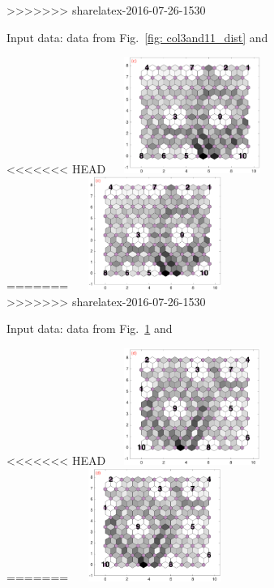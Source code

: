\begin{figure}
\begin{subfigure}[b]{0.25\textwidth}
>>>>>>> sharelatex-2016-07-26-1530
        \caption{Input data: data from Fig.~\ref{fig: col3and11_dist} and \oiii}
        \label{fig: col3and12_dist}
    \end{subfigure}
        \hfill
    \begin{subfigure}[b]{0.25\textwidth}
        \centering
<<<<<<< HEAD
        \includegraphics[width=54mm, height=38mm]{../../images0.01/M31/2D/diff_dimension/combine_2D_data_between_cols3and13.png}
=======
        \includegraphics[width=54mm, height=37mm]{../../images0.01/M31/2D/diff_dimension/combine_2D_data_between_cols3and13.png}
>>>>>>> sharelatex-2016-07-26-1530
        \caption{Input data: data from Fig.~\ref{fig: col3and12_dist} and \sii}
        \label{fig: col3and13_dist}
    \end{subfigure}
        \hfill
    \begin{subfigure}[b]{0.25\textwidth}
        \centering
<<<<<<< HEAD
        \includegraphics[width=54mm, height=38mm]{../../images0.01/M31/2D/diff_dimension/combine_2D_data_between_cols3and14.png}
=======
        \includegraphics[width=54mm, height=37mm]{../../images0.01/M31/2D/diff_dimension/combine_2D_data_between_cols3and14.png}

\end{subfigure}
\end{figure}
